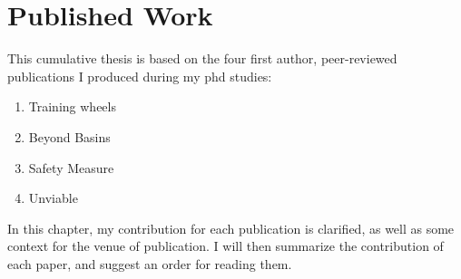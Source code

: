 
\chapter{Published Work}
This cumulative thesis is based on the four first author, peer-reviewed publications I produced during my phd studies:

\begin{enumerate}
    \item Training wheels
    \item Beyond Basins
    \item Safety Measure
    \item Unviable
\end{enumerate}

In this chapter, my contribution for each publication is clarified, as well as some context for the venue of publication. I will then summarize the contribution of each paper, and suggest an order for reading them.